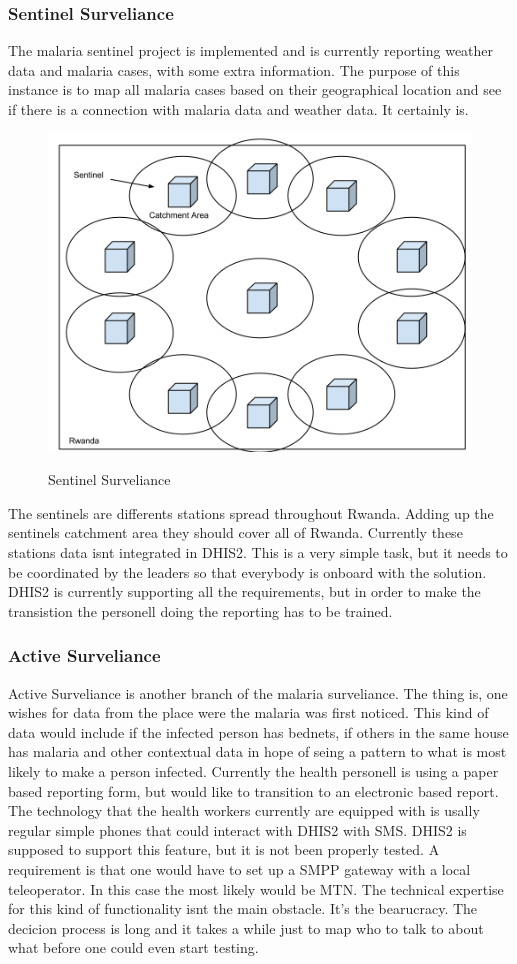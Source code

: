\subsubsection{Sentinel Surveliance}
The malaria sentinel project is implemented and is currently reporting weather data and malaria cases, with some extra information.
The purpose of this instance is to map all malaria cases based on their geographical location and see if there is a connection with malaria data and weather data. 
It certainly is. 
\begin{figure}
\centering
\includegraphics[width=12cm]{empirical/images/sentinel_surveliance}
\label{sentinel_surveliance}
\caption{Sentinel Surveliance}
\end{figure}
The sentinels are differents stations spread throughout Rwanda. Adding up the sentinels catchment area they should cover all of Rwanda. 
Currently these stations data isnt integrated in DHIS2. This is a very simple task, but it needs to be coordinated by the leaders so that everybody is onboard with the solution.
DHIS2 is currently supporting all the requirements, but in order to make the transistion the personell doing the reporting has to be trained.
\subsubsection{Active Surveliance}
Active Surveliance is another branch of the malaria surveliance. The thing is, one wishes for data from the place were the malaria was first noticed.
This kind of data would include if the infected person has bednets, if others in the same house has malaria and other contextual data in hope of seing a pattern to what is most likely to make a person infected. Currently the health personell is using a paper based reporting form, but would like to transition to an electronic based report.
The technology that the health workers currently are equipped with is usally regular simple phones that could interact with DHIS2 with SMS. DHIS2 is supposed to support this feature, but it is not been properly tested. A requirement is that one would have to set up a SMPP gateway with a local teleoperator. In this case the most likely would be MTN.
The technical expertise for this kind of functionality isnt the main obstacle. It's the bearucracy. The decicion process is long and it takes a while just to map who to talk to about what before one could even start testing.
